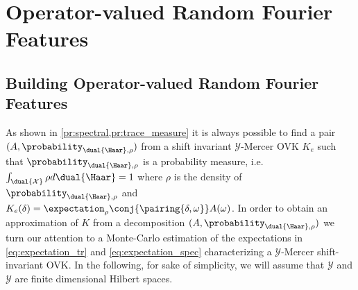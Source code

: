 \section{Operator-valued Random Fourier Features}
\label{sec:building_ORFF}
\subsection{Building Operator-valued Random Fourier Features}

As shown in \cref{pr:spectral,pr:trace_measure} it is
always possible to find a pair $(A, \probability_{\dual{\Haar},\rho})$ from a
shift invariant $\mathcal{Y}$-Mercer \acl{OVK} $K_e$ such that
$\probability_{\dual{\Haar},\rho}$ is a probability measure, i.e. $\int_{\dual{\mathcal{X}}} \rho d\dual{\Haar}=1$ where $\rho$ is the
density of $\probability_{\dual{\Haar},\rho}$ and
$K_e(\delta)=\expectation_\rho{\conj{\pairing{\delta,\omega}}A(\omega)}$. In
order to obtain an approximation of $K$ from a decomposition $(A,
\probability_{\dual{\Haar},\rho})$ we turn our attention to a Monte-Carlo
estimation of the expectations in \cref{eq:expectation_tr} and
\cref{eq:expectation_spec} characterizing a $\mathcal{Y}$-Mercer
shift-invariant \acl{OVK}. In the following, for sake of simplicity, we will assume that $\mathcal{Y}$ and $\mathcal{Y}$ are finite dimensional Hilbert spaces.
\paragraph{}

